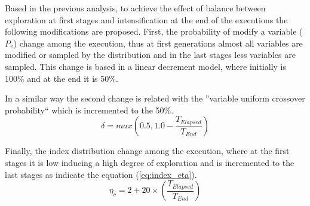 Based in the previous analysis, to achieve the effect of balance between exploration at first stages and intensification at the end of the executions the following modifications are proposed.
%
First, the probability of modify a variable ($P_v$) change among the execution, thus at first generations almost all variables are modified or sampled by the distribution and in the last stages less variables are sampled.
%
This change is based in a linear decrement model, where initially is 100\% and at the end it is 50\%.
%

In a similar way the second change is related with the ''variable uniform crossover probability`` which is incremented to the 50\%.
\begin{equation}
\delta = max \left (0.5, 1.0 - \frac{T_{Elapsed}}{T_{End}} \right )
\end{equation}

%
Finally, the index distribution change among the execution, where at the first stages it is low inducing a high degree of exploration and is incremented to the last stages as indicate the equation (\ref{eq:index_eta}).
\begin{equation}\label{eq:index_eta}
 \eta_c = 2 + 20 \times \left ( \frac{T_{Elapsed}}{T_{End}} \right)
\end{equation}

